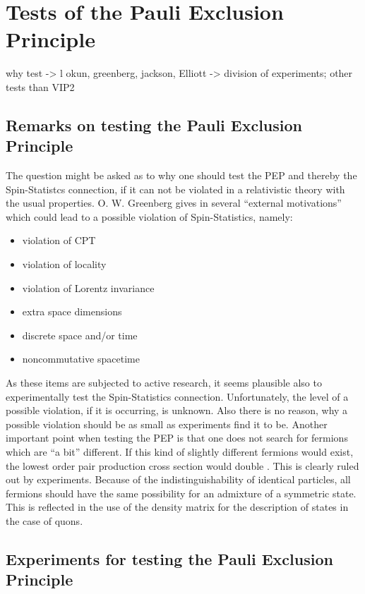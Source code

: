 \section{Tests of the Pauli Exclusion Principle}

why test -> l okun, greenberg, jackson, 
Elliott -> division of experiments; other tests than VIP2

\subsection{Remarks on testing the Pauli Exclusion Principle}

The question might be asked as to why one should test the PEP and thereby the Spin-Statistcs connection, if it can not be violated in a relativistic theory with the usual properties. O. W. Greenberg gives in \cite{Greenberg2000} several ``external motivations'' which could lead to a possible violation of Spin-Statistics, namely:
\begin{itemize}
 \item violation of CPT
 \item violation of locality
 \item violation of Lorentz invariance
 \item extra space dimensions
 \item discrete space and/or time
 \item noncommutative spacetime
\end{itemize}
As these items are subjected to active research, it seems plausible also to experimentally test the Spin-Statistics connection. Unfortunately, the level of a possible violation, if it is occurring, is unknown. Also there is no reason, why a possible violation should be as small as experiments find it to be. Another important point when testing the PEP is that one does not search for fermions which are ``a bit'' different. If this kind of slightly different fermions would exist, the lowest order pair production cross section would double \cite{Greenberg2000}. This is clearly ruled out by experiments. Because of the indistinguishability of identical particles, all fermions should have the same possibility for an admixture of a symmetric state. This is reflected in the use of the density matrix for the description of states in the case of quons.

\subsection{Experiments for testing the Pauli Exclusion Principle}
\label{sec:experiments}

